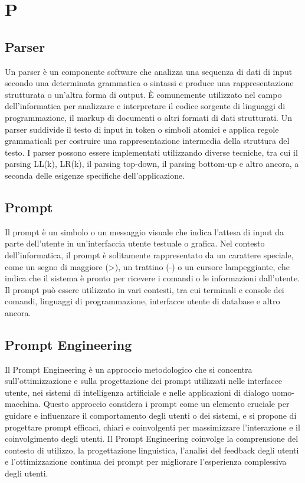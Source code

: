 \section{P}


\vspace{2em}
\subsection*{Parser}
Un parser è un componente software che analizza una sequenza di dati di input secondo una determinata grammatica o sintassi e produce una rappresentazione strutturata o un'altra forma di output. È comunemente utilizzato nel campo dell'informatica per analizzare e interpretare il codice sorgente di linguaggi di programmazione, il markup di documenti o altri formati di dati strutturati. Un parser suddivide il testo di input in token o simboli atomici e applica regole grammaticali per costruire una rappresentazione intermedia della struttura del testo. I parser possono essere implementati utilizzando diverse tecniche, tra cui il parsing LL(k), LR(k), il parsing top-down, il parsing bottom-up e altro ancora, a seconda delle esigenze specifiche dell'applicazione.

\vspace{2em}
\subsection*{Prompt}
Il prompt è un simbolo o un messaggio visuale che indica l'attesa di input da parte dell'utente in un'interfaccia utente testuale o grafica. Nel contesto dell'informatica, il prompt è solitamente rappresentato da un carattere speciale, come un segno di maggiore (>), un trattino (-) o un cursore lampeggiante, che indica che il sistema è pronto per ricevere i comandi o le informazioni dall'utente. Il prompt può essere utilizzato in vari contesti, tra cui terminali e console dei comandi, linguaggi di programmazione, interfacce utente di database e altro ancora.

\vspace{2em}
\subsection*{Prompt Engineering}
Il Prompt Engineering è un approccio metodologico che si concentra sull'ottimizzazione e sulla progettazione dei prompt utilizzati nelle interfacce utente, nei sistemi di intelligenza artificiale e nelle applicazioni di dialogo uomo-macchina. Questo approccio considera i prompt come un elemento cruciale per guidare e influenzare il comportamento degli utenti o dei sistemi, e si propone di progettare prompt efficaci, chiari e coinvolgenti per massimizzare l'interazione e il coinvolgimento degli utenti. Il Prompt Engineering coinvolge la comprensione del contesto di utilizzo, la progettazione linguistica, l'analisi del feedback degli utenti e l'ottimizzazione continua dei prompt per migliorare l'esperienza complessiva degli utenti.

